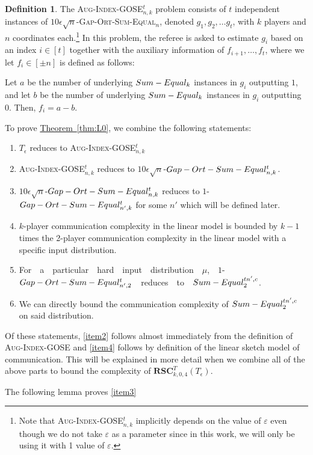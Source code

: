 \documentclass[11pt]{article}
\numberwithin{equation}{section}
\theoremstyle{definition}
\newtheorem{definition}[theorem]{Definition}
\theoremstyle{plain}
\newcommand{\expref}[2]{\hyperref[#2]{#1~\ref{#2}}}
\newcommand{\rsc}{\ensuremath{\mathbf{RSC}}}
\newcommand{\sumequal}{\textsc{Sum-Equal} }
\newcommand{\gose}{\textsc{Gap-Ort-Sum-Equal}}
\newcommand{\auggo}{\textsc{Aug-Index-GOSE}}
\begin{document}
\begin{definition}
The \auggo$_{n,k}^t$ problem consists of $t$ independent instances of $10\epsilon\sqrt{n}$-\gose$_n$, denoted $g_1, g_2, \dots g_t$, with $k$ players and $n$ coordinates each.\footnote{Note that \auggo$_{n,k}^t$ implicitly depends on the value of $\varepsilon$ even though we do not take $\varepsilon$ as a parameter since in this work, we will only be using it with 1 value of $\varepsilon$.} In this problem, the referee is asked to estimate $g_i$ based on an index $i\in[t]$ together with the auxiliary information of $f_{i+1},\dots, f_t$, where we let $f_i \in [\pm n]$ is defined as follows:

{\color{black}Let $a$ be the number of underlying $\sumequal_k$ instances in $g_i$ outputting $1$, and let $b$ be the number of underlying $\sumequal_k$ instances in $g_i$ outputting $0$. Then, $f_i = a-b$.}
\end{definition}
{\color{black}
To prove \expref{Theorem}{thm:L0}, we combine the following statements:
%

%
%
\begin{enumerate}[(1)]
    \item \label{item1} $T_\epsilon$ reduces to \auggo$_{n,k}^t$
    \item \label{item2}
      \auggo$_{n,k}^t$ reduces to $10\epsilon \sqrt{n}$-$\gose_{n,k}^t$.
    \item \label{item3}
$10\epsilon \sqrt{n}$-$\gose_{n,k}^t$ reduces to $1$-$\gose_{n',k}^t$ for some $n'$ which will be defined later.
    \item \label{item4}
$k$-player communication complexity in the linear model is bounded by $k-1$ times the 2-player communication complexity in the linear model with a specific input distribution.
%
%
    \item \label{item5}
For\ \  a\ \ particular\ \ hard\ \ input\ \ distribution\ \ $\mu$,\ \
 $1$-$\gose_{n',2}^t$\ \ reduces\ \ to\ \ $\sumequal_2^{tn',c}$.
    \item \label{item6}
We can directly bound the communication complexity of $\sumequal_2^{tn',c}$ on said distribution.
\end{enumerate}
Of these statements, %
\ref{item2}   %
follows almost immediately from the definition of \auggo \hspace{0em} and 
%
\ref{item4}   %
follows by definition of the linear sketch model of communication. This will be explained in more detail when we combine all of the above parts to bound the complexity of $\rsc_{k,0,4}^T(T_\epsilon)$.

The following lemma proves %
\ref{item3}   %
}
\end{document}
